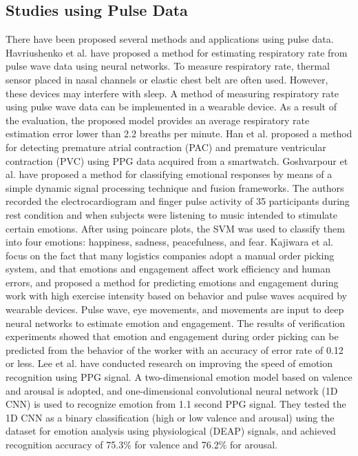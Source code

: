 \documentclass[sigchi,authordraft]{acmart}
\begin{document}
\subsection{Studies using Pulse Data}
There have been proposed several methods and applications using pulse data.
Havriushenko et al.\cite{respiratory_rate_estimation} have proposed a method for estimating respiratory rate from pulse wave data using neural networks. To measure respiratory rate, thermal sensor placed in nasal channels or elastic chest belt are often used. However, these devices may interfere with sleep. A method of measuring respiratory rate using pulse wave data can be implemented in a wearable device. As a result of the evaluation, the proposed model provides an average respiratory rate estimation error lower than 2.2 breaths per minute.
Han et al.\cite{arrhythmia_detection} proposed a method for detecting premature atrial contraction (PAC) and premature ventricular contraction (PVC) using PPG data acquired from a smartwatch.
Goshvarpour et al.\cite{emotion_recognition_poincare} have proposed a method for classifying emotional responses by means of a simple dynamic signal processing technique and fusion frameworks. The authors recorded the electrocardiogram and finger pulse activity of 35 participants during rest condition and when subjects were listening to music intended to stimulate certain emotions. After using poincare plots, the SVM was used to classify them into four emotions: happiness, sadness, peacefulness, and fear.
Kajiwara et al.\cite{pulse_order_picking} focus on the fact that many logistics companies adopt a manual order picking system, and that emotions and engagement affect work efficiency and human errors, and proposed a method for predicting emotions and engagement during work with high exercise intensity based on behavior and pulse waves acquired by wearable devices. Pulse wave, eye movements, and movements are input to deep neural networks to estimate emotion and engagement. The results of verification experiments showed that emotion and engagement during order picking can be predicted from the behavior of the worker with an accuracy of error rate of 0.12 or less.
Lee et al.\cite{fast_emotion_recognition} have conducted research on improving the speed of emotion recognition using PPG signal. A two-dimensional emotion model based on valence and arousal is adopted, and one-dimensional convolutional neural network (1D CNN) is used to recognize emotion from 1.1 second PPG signal. They tested the 1D CNN as a binary classification (high or low valence and arousal) using the dataset for emotion analysis using physiological (DEAP) signals, and achieved recognition accuracy of 75.3\% for valence and 76.2\% for arousal.\par
\end{document}
